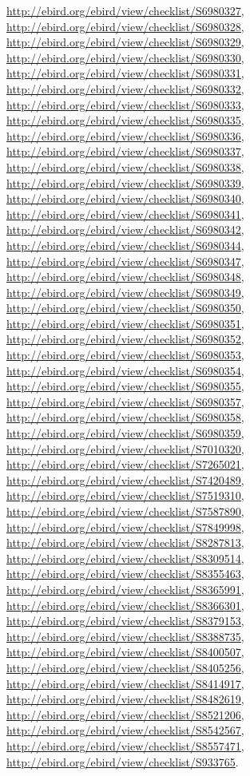 \documentclass[9pt, article]{memoir}
\begin{document}
\begin{multicols}{2}
\url{http://ebird.org/ebird/view/checklist/S6980327}, 
\url{http://ebird.org/ebird/view/checklist/S6980328}, 
\url{http://ebird.org/ebird/view/checklist/S6980329}, 
\url{http://ebird.org/ebird/view/checklist/S6980330}, 
\url{http://ebird.org/ebird/view/checklist/S6980331}, 
\url{http://ebird.org/ebird/view/checklist/S6980332}, 
\url{http://ebird.org/ebird/view/checklist/S6980333}, 
\url{http://ebird.org/ebird/view/checklist/S6980335}, 
\url{http://ebird.org/ebird/view/checklist/S6980336}, 
\url{http://ebird.org/ebird/view/checklist/S6980337}, 
\url{http://ebird.org/ebird/view/checklist/S6980338}, 
\url{http://ebird.org/ebird/view/checklist/S6980339}, 
\url{http://ebird.org/ebird/view/checklist/S6980340}, 
\url{http://ebird.org/ebird/view/checklist/S6980341}, 
\url{http://ebird.org/ebird/view/checklist/S6980342}, 
\url{http://ebird.org/ebird/view/checklist/S6980344}, 
\url{http://ebird.org/ebird/view/checklist/S6980347}, 
\url{http://ebird.org/ebird/view/checklist/S6980348}, 
\url{http://ebird.org/ebird/view/checklist/S6980349}, 
\url{http://ebird.org/ebird/view/checklist/S6980350}, 
\url{http://ebird.org/ebird/view/checklist/S6980351}, 
\url{http://ebird.org/ebird/view/checklist/S6980352}, 
\url{http://ebird.org/ebird/view/checklist/S6980353}, 
\url{http://ebird.org/ebird/view/checklist/S6980354}, 
\url{http://ebird.org/ebird/view/checklist/S6980355}, 
\url{http://ebird.org/ebird/view/checklist/S6980357}, 
\url{http://ebird.org/ebird/view/checklist/S6980358}, 
\url{http://ebird.org/ebird/view/checklist/S6980359}, 
\url{http://ebird.org/ebird/view/checklist/S7010320}, 
\url{http://ebird.org/ebird/view/checklist/S7265021}, 
\url{http://ebird.org/ebird/view/checklist/S7420489}, 
\url{http://ebird.org/ebird/view/checklist/S7519310}, 
\url{http://ebird.org/ebird/view/checklist/S7587890}, 
\url{http://ebird.org/ebird/view/checklist/S7849998}, 
\url{http://ebird.org/ebird/view/checklist/S8287813}, 
\url{http://ebird.org/ebird/view/checklist/S8309514}, 
\url{http://ebird.org/ebird/view/checklist/S8355463}, 
\url{http://ebird.org/ebird/view/checklist/S8365991}, 
\url{http://ebird.org/ebird/view/checklist/S8366301}, 
\url{http://ebird.org/ebird/view/checklist/S8379153}, 
\url{http://ebird.org/ebird/view/checklist/S8388735}, 
\url{http://ebird.org/ebird/view/checklist/S8400507}, 
\url{http://ebird.org/ebird/view/checklist/S8405256}, 
\url{http://ebird.org/ebird/view/checklist/S8414917}, 
\url{http://ebird.org/ebird/view/checklist/S8482619}, 
\url{http://ebird.org/ebird/view/checklist/S8521206}, 
\url{http://ebird.org/ebird/view/checklist/S8542567}, 
\url{http://ebird.org/ebird/view/checklist/S8557471}, 
\url{http://ebird.org/ebird/view/checklist/S933765}.


\end{multicols}
\end{document}
